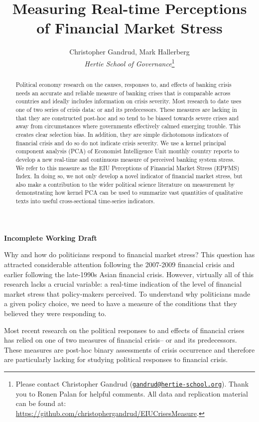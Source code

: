 \documentclass[]{article}
\title{Measuring Real-time Perceptions of Financial Market Stress}
\author{Christopher Gandrud, Mark Hallerberg \\ \emph{Hertie School of Governance}\footnote{Please contact Christopher Gandrud
(\href{mailto:gandrud@hertie-school.org}{\nolinkurl{gandrud@hertie-school.org}}).
Thank you to Ronen Palan for helpful comments. All data and
replication material can be found at:
\url{https://github.com/christophergandrud/EIUCrisesMeasure}.}}
\begin{document}
\maketitle


\textbf{Incomplete Working Draft}

\begin{abstract}
Political economy research on the causes, responses to, and effects of banking crisis needs an accurate and reliable measure of banking crises that is comparable across countries and ideally includes information on crisis severity. Most research to date uses one of two series of crisis data: \cite{Reinhart2009} or \cite{laeven2013} and its predecessors. These measures are lacking in that they are constructed post-hoc and so tend to be biased towards severe crises and away from circumstances where governments effectively calmed emerging trouble. This creates clear selection bias. In addition, they are simple dichotomous indicators of financial crisis and do so do not indicate crisis severity. We use a kernel principal component analysis (PCA) of Economist Intelligence Unit monthly country reports to develop a new real-time and continuous measure of perceived banking system stress. We refer to this measure as the EIU Perceptions of Financial Market Stress (EPFMS) Index. In doing so, we not only develop a novel indicator of financial market stress, but also make a contribution to the wider political science literature on measurement by demonstrating how kernel PCA can be used to summarize vast quantities of qualitative texts into useful cross-sectional time-series indicators.
\end{abstract}

Why and how do politicians respond to financial market stress? This
question has attracted considerable attention following the
2007-2009 financial crisis and earlier following the late-1990s Asian
financial crisis. However, virtually all of this research lacks a
crucial variable: a real-time indication of the level of financial
market stress that policy-makers perceived. To understand
why politicians made a given policy choice, we need to have a measure of
the conditions that they believed they were responding to.

Most recent research on the political responses to and effects of financial crises has relied on one of two measures of financial crisis--\cite{Reinhart2009} or \cite{laeven2013} and its predecessors. These measures are post-hoc binary assessments of crisis occurrence and therefore are particularly lacking for studying political responses to financial crisis.
\end{document}

